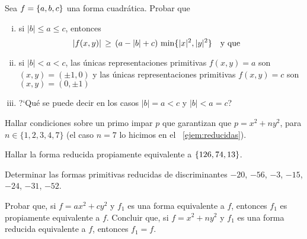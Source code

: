 \begin{ejerDefinidas}\label{ejer:definidas:cota}
	Sea $f=\left\{a,b,c\right\}$ una forma cuadr\'atica. Probar que
	\begin{enumerate}[(i)]
		\item\label{item:ejer:definidas:cota:i}
			si $|b|\leq a\leq c$, entonces
			\begin{displaymath}
				|f(x,y)|\,\geq\,
					(a-|b|+c)\, \min\{|x|^2,|y|^2\}
				\quad\text{y que}\quad
			\end{displaymath}
		\item\label{item:ejer:definidas:cota:ii}
			si $|b|<a<c$,
			las \'unicas representaciones primitivas
			$f(x,y)=a$ son $(x,y)=(\pm 1,0)$ y
			las \'unicas representaciones primitivas
			$f(x,y)=c$ son $(x,y)=(0,\pm 1)$
		\item\label{item:ejer:definidas:cota:iii}
			?`Qu\'e se puede decir en los casos $|b|=a<c$ y
			$|b|<a=c$?
	\end{enumerate}
\end{ejerDefinidas}

\begin{ejerDefinidas}
	Hallar condiciones sobre un primo impar $p$ que garantizan
	que $p=x^2+ny^2$, para $n\in\{1,2,3,4,7\}$ (el caso
	$n=7$ lo hicimos en el \ejemname~\ref{ejem:reducidas}).
\end{ejerDefinidas}

\begin{ejerDefinidas}
	Hallar la forma reducida propiamente equivalente a
	$\left\{126,74,13\right\}$.
\end{ejerDefinidas}

\begin{ejerDefinidas}\label{ejer:definidas:varios}
	Determinar las formas primitivas reducidas de discriminantes
	$-20$, $-56$, $-3$, $-15$, $-24$, $-31$, $-52$.
\end{ejerDefinidas}

\begin{ejerDefinidas}\label{ejer:definidas:representaciones}
	Probar que, si $f=ax^2+cy^2$ y $f_1$ es una forma
	equivalente a $f$, entonces $f_1$ es propiamente
	equivalente a $f$. Concluir que, si $f=x^2+ny^2$ y
	$f_1$ es una forma reducida equivalente a $f$, entonces
	$f_1=f$.
\end{ejerDefinidas}


